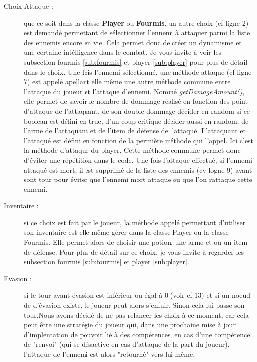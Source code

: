 			\begin{description}
				\item[Choix Attaque :]{que ce soit dans la classe \textbf{Player} ou \textbf{Fourmis}, un autre choix (cf ligne 2) est demandé permettant de sélectionner l'ennemi à attaquer parmi la liste des ennemis encore en vie. Cela permet donc de créer un dynamisme et une certaine intélligence dans le combat. Je vous invite à voir les subsection fourmis \ref{sub:fourmis} et player \ref{sub:player} pour plus de détail dans le choix.
				 Une fois l'ennemi sélectionné, une méthode attaque (cf ligne 7) est appelé apellant elle même une autre méthode commune entre l'attaque du joueur et l'attaque d'ennemi. Nommé \textit{getDamageAmount()}, elle permet de savoir le nombre de dommage réalisé en fonction des point d'attaque de l'attaquant, de son double dommage décider en random si ce boolean est défini en true, d'un coup critique décider aussi en random, de l'arme de l'attaquant et de l'item de défense de l'attaqué. L'attaquant et l'attaqué est défini en fonction de la permière méthode qui l'appel. Ici c'est la méthode d'attaque du player. Cette méthode commune permet donc d'éviter une répétition dans le code.}
				Une fois l'attaque effectué, si l'ennemi attaqué est mort, il est supprimé de la liste des ennemis (cv logne 9) avant sont tour pour éviter que l'ennemi mort attaque ou que l'on rattaque cette ennemi.
				\item[Inventaire :]{si ce choix est fait par le joueur, la méthode appelé permettant d'utiliser son inventaire est elle même gérer dans la classe Player ou la classe Fourmis. Elle permet alors de choisir une potion, une arme et ou un item de défense. Pour plus de détail sur ce choix, je vous invite à regarder les subsection fourmis \ref{sub:fourmis} et player \ref{sub:player}.}
				\item[Evasion :]{si le tour avant évasion est inférieur ou égal à 0 (voir cf 13) et si un noeud de d'évasion existe, le joueur peut alors s'enfuir. Sinon cela lui passe son tour.Nous avons décidé de ne pas relancer les choix à ce moment, car cela peut être une stratégie du joueur qui, dans une prochaine mise à jour d'implentation de pouvoir lié à des compétences, en cas d'une compétence de "renvoi" (qui se désactive en cas d'attaque de la part du joueur), l'attaque de l'ennemi est alors "retourné" vers lui même.}
			\end{description}


